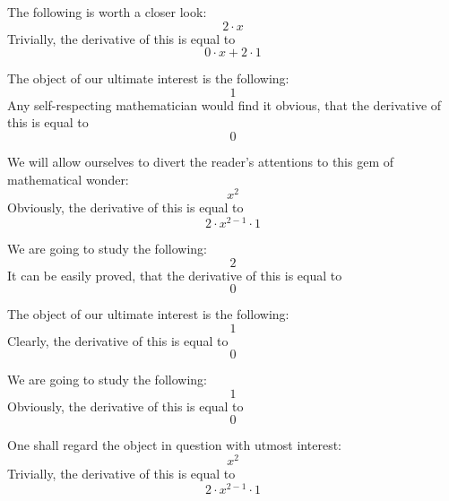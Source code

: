 \documentclass{article}
\begin{document}
The following is worth a closer look:
\begin{equation}
2 \cdot x 
\end{equation}
Trivially, the derivative of this is equal to
\begin{equation}
0 \cdot x + 2 \cdot 1 
\end{equation}

The object of our ultimate interest is the following:
\begin{equation}
1 
\end{equation}
Any self-respecting mathematician would find it obvious, that the derivative of this is equal to
\begin{equation}
0 
\end{equation}

We will allow ourselves to divert the reader's attentions to this gem of mathematical wonder:
\begin{equation}
x ^{2 } 
\end{equation}
Obviously, the derivative of this is equal to
\begin{equation}
2 \cdot x ^{2 - 1 } \cdot 1 
\end{equation}

We are going to study the following:
\begin{equation}
2 
\end{equation}
It can be easily proved, that the derivative of this is equal to
\begin{equation}
0 
\end{equation}

The object of our ultimate interest is the following:
\begin{equation}
1 
\end{equation}
Clearly, the derivative of this is equal to
\begin{equation}
0 
\end{equation}

We are going to study the following:
\begin{equation}
1 
\end{equation}
Obviously, the derivative of this is equal to
\begin{equation}
0 
\end{equation}

One shall regard the object in question with utmost interest:
\begin{equation}
x ^{2 } 
\end{equation}
Trivially, the derivative of this is equal to
\begin{equation}
2 \cdot x ^{2 - 1 } \cdot 1 
\end{equation}
\end{document}
